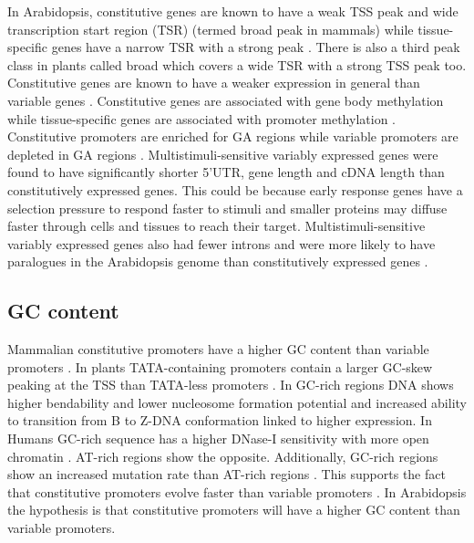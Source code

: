 \documentclass[../main.tex]{subfiles}
\begin{document}
In Arabidopsis, constitutive genes are known to have a weak TSS peak and wide transcription start region (TSR) (termed broad peak in mammals) while tissue-specific genes have a narrow TSR with a strong peak \autocite{mortonPairedEndAnalysisTranscription2014}. There is also a third peak class in plants called broad which covers a wide TSR with a strong TSS peak too.
Constitutive genes are known to have a weaker expression in general than variable genes \autocite{czechowskiGenomeWideIdentificationTesting2005,mortonPairedEndAnalysisTranscription2014}.
Constitutive genes are associated with gene body methylation \autocite{zhangGenomewideHighResolutionMapping2006, takunoBodyMethylatedGenesArabidopsis2012,aceitunoRulesGeneExpression2008} while tissue-specific genes are associated with promoter methylation \autocite{zhangGenomewideHighResolutionMapping2006}.
Constitutive promoters are enriched for GA regions while variable promoters are depleted in GA regions \autocite{yamamotoHeterogeneityArabidopsisCore2009}. 
Multistimuli\hyp{}sensitive variably expressed genes were found to have significantly shorter 5'UTR, gene length and cDNA length than constitutively expressed genes.
This could be because early response genes have a selection pressure to respond faster to stimuli and smaller proteins may diffuse faster through cells and tissues to reach their target.
Multistimuli\hyp{}sensitive variably expressed genes also had fewer introns and were more likely to have paralogues in the Arabidopsis genome than constitutively expressed genes \autocite{waltherRegulatoryCodeTranscriptional2007}.

\subsection{GC content}
\label{chapter1:introduction:gc-content}

Mammalian constitutive promoters have a higher GC content than variable promoters \autocite{vinogradovDNAHelixImportance2017,weiCharacterizationGenePromoters2019}.
In plants TATA-containing promoters contain a larger GC-skew peaking at the TSS than TATA-less promoters \autocite{zuoIdentificationTATATATAless2011}.
In GC-rich regions DNA shows higher bendability \autocite{vinogradovBendableGenesWarmblooded2001,vinogradovDNAHelixImportance2003} and lower nucleosome formation potential \autocite{vinogradovNoncodingDNAIsochores2005} and increased ability to transition from B to Z-DNA conformation \autocite{vinogradovDNAHelixImportance2003} linked to higher expression.
In Humans GC-rich sequence has a higher DNase-I sensitivity with more open chromatin \autocite{difilippoMappingDNaseIHypersensitive2008}.
AT-rich regions show the opposite.
Additionally, GC-rich regions show an increased mutation rate than AT-rich regions \autocite{vinogradovDNAHelixImportance2017}.
This supports the fact that constitutive promoters evolve faster than variable promoters \autocite{farreHousekeepingGenesTend2007,carninciGenomewideAnalysisMammalian2006}.
In Arabidopsis the hypothesis is that constitutive promoters will have a higher GC content than variable promoters.
\end{document}
